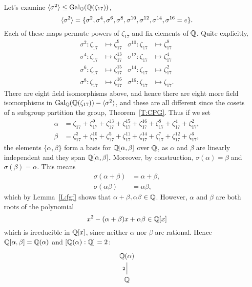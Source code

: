 \documentclass{ximera}
\begin{document}
\begin{example}
\[  \]
  Let's examine $\langle\sigma^2\rangle\leq \operatorname{Gal}_\mathbb Q(\mathbb Q(\zeta_{17}))$,
  \[
  \langle\sigma^2\rangle = \{ \sigma^2, \sigma^4,\sigma^6,\sigma^8,\sigma^{10},\sigma^{12},\sigma^{14},\sigma^{16} = e\}.
  \]
  Each of these maps permute powers of $\zeta_{17}$ and fix elements
  of $\mathbb Q$. Quite explicitly,
  \begin{align*}
    \sigma^2: \zeta_{17} &\mapsto \zeta_{17}^9    & \sigma^{10}: \zeta_{17} &\mapsto \zeta_{17}^{8}\\
    \sigma^4: \zeta_{17} &\mapsto \zeta_{17}^{13} & \sigma^{12}: \zeta_{17} &\mapsto \zeta_{17}^{4}\\
    \sigma^6: \zeta_{17} &\mapsto \zeta_{17}^{15} & \sigma^{14}: \zeta_{17} &\mapsto \zeta_{17}^{2}\\
    \sigma^8: \zeta_{17} &\mapsto \zeta_{17}^{16} & \sigma^{16}: \zeta_{17} &\mapsto \zeta_{17}.
  \end{align*}
  There are eight field isomorphisms above, and hence there are eight
  more field isomorphisms in $\operatorname{Gal}_\mathbb Q(\mathbb Q(\zeta_{17})) - \langle
  \sigma^2\rangle$, and these are all different since the cosets of a
  subgroup partition the group, Theorem~\ref{T:CPG}. Thus if we set 
  \begin{align*}
    \alpha &= \zeta_{17}   + \zeta_{17}^9 + \zeta_{17}^{13} + \zeta_{17}^{15} + \zeta_{17}^{16} + \zeta_{17}^{8} + \zeta_{17}^{4} + \zeta_{17}^{2},\\
    \beta &= \zeta_{17}^3 + \zeta_{17}^{10} + \zeta_{17}^{5} + \zeta_{17}^{11} + \zeta_{17}^{14} + \zeta_{17}^{7} + \zeta_{17}^{12} + \zeta_{17}^{6},
  \end{align*} 
  the elements $\{\alpha,\beta\}$ form a basis for $\mathbb Q[\alpha,\beta]$
  over $\mathbb Q$, as $\alpha$ and $\beta$ are linearly independent and they
  span $\mathbb Q[\alpha,\beta]$. Moreover, by construction, $\sigma(\alpha)
  = \beta$ and $\sigma(\beta) = \alpha$. This means
  \begin{align*}
    \sigma(\alpha+\beta) &= \alpha + \beta,\\
    \sigma(\alpha\beta) &= \alpha\beta,
  \end{align*}
  which by Lemma~\ref{L:fgf} shows that
  $\alpha+\beta,\alpha\beta\in\mathbb Q$. However, $\alpha$ and $\beta$ are
  both roots of the polynomial
  \[
  x^2 - (\alpha +\beta) x + \alpha\beta\in\mathbb Q[x]
  \]
  which is irreducible in $\mathbb Q[x]$, since neither $\alpha$ nor $\beta$
  are rational. Hence $\mathbb Q[\alpha,\beta]= \mathbb Q(\alpha)$ and
  $[\mathbb Q(\alpha):\mathbb Q] = 2$:
  \[
  \begin{tikzcd}
    \Q(\alpha) \\ \Q \ar[u,-,"2"]

\end{tikzcd}\]
\end{example}
\end{document}
